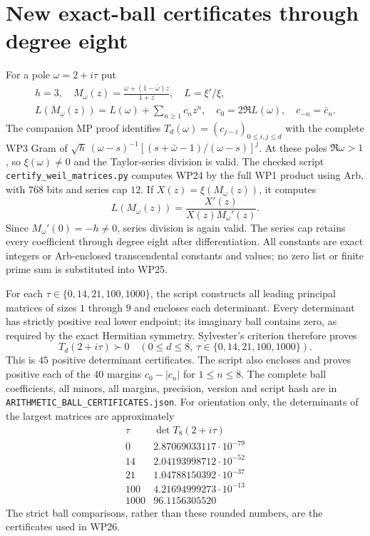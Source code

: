 \section{New exact-ball certificates through degree eight}
For a pole $\omega=2+i\tau$ put
\[
 \begin{gathered}
 h=3,\quad M_\omega(z)=\frac{\omega+(1-\bar\omega)z}{1+z},
 \quad L=\xi'/\xi,\\
 L(M_\omega(z))=L(\omega)+\sum_{n\ge1}c_nz^n,
 \quad c_0=2\Re L(\omega),\quad c_{-n}=\bar c_n.
 \end{gathered}                                                \tag{WP24}
\]
The companion MP proof identifies $T_d(\omega)=(c_{j-i})_{0\le i,j\le d}$
with the complete WP3 Gram of
$\sqrt h\,(\omega-s)^{-1}[(s+\bar\omega-1)/(\omega-s)]^j$.
At these poles $\Re\omega>1$, so $\xi(\omega)\ne0$ and the
Taylor-series division is valid. The checked script
\texttt{certify\_weil\_matrices.py} computes WP24 by the full
WP1 product using Arb, with $768$ bits and series cap $12$.
If $X(z)=\xi(M_\omega(z))$, it computes
\[
          L(M_\omega(z))=\frac{X'(z)}{X(z)M_\omega'(z)}.
                                                                  \tag{WP25}
\]
Since $M_\omega'(0)=-h\ne0$, series division is again valid.
The series cap retains every coefficient through degree eight
after differentiation. All constants are exact integers or
Arb-enclosed transcendental constants and values; no zero list
or finite prime sum is substituted into WP25.

For each $\tau\in\{0,14,21,100,1000\}$, the script constructs
all leading principal matrices of sizes $1$ through $9$ and
encloses each determinant. Every determinant has strictly
positive real lower endpoint; its imaginary ball contains
zero, as required by the exact Hermitian symmetry. Sylvester's
criterion therefore proves
\[
 \boxed{T_d(2+i\tau)\succ0\quad
       (0\le d\le8,\ \tau\in\{0,14,21,100,1000\}).}           \tag{WP26}
\]
This is $45$ positive determinant certificates. The script
also encloses and proves positive each of the $40$ margins
$c_0-|c_n|$ for $1\le n\le8$. The complete ball coefficients,
all minors, all margins, precision, version and script hash are
in \texttt{ARITHMETIC\_BALL\_CERTIFICATES.json}. For orientation
only, the determinants of the largest matrices are approximately
\[
\begin{array}{c|r}
\tau&\det T_8(2+i\tau)\\\hline
0&2.87069033117\cdot10^{-79}\\
14&2.04193998712\cdot10^{-52}\\
21&1.04788150392\cdot10^{-37}\\
100&4.21694999273\cdot10^{-13}\\
1000&96.1156305520
\end{array}                                                     \tag{WP27}
\]
The strict ball comparisons, rather than these rounded
numbers, are the certificates used in WP26.

